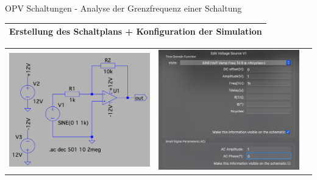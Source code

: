 \begin{frame}[t]{OPV Schaltungen - Analyse der Grenzfrequenz einer Schaltung }
        \begin{spacing}{0.9} \begin{tiny}
          \begin{table}[h!]
            \begin{tabular}{p{10cm}}
              \hline
              \textbf{Erstellung des Schaltplans + Konfiguration der Simulation} \\
              \hline     
            \end{tabular}
          \begin{tabular}{p{2cm} p{2cm} p{6cm}}
            \begin{minipage}{.2\textwidth}
              \includegraphics[width=0.8\linewidth]{pictures/opamp_3.png}
            \end{minipage} 
            &  
            \begin{minipage}{.2\textwidth}
              \includegraphics[width=0.8\linewidth]{pictures/ac_small_signal.png}

\end{minipage}
\end{tabular}
\end{table}
\end{tiny}
\end{spacing}
\end{frame}
